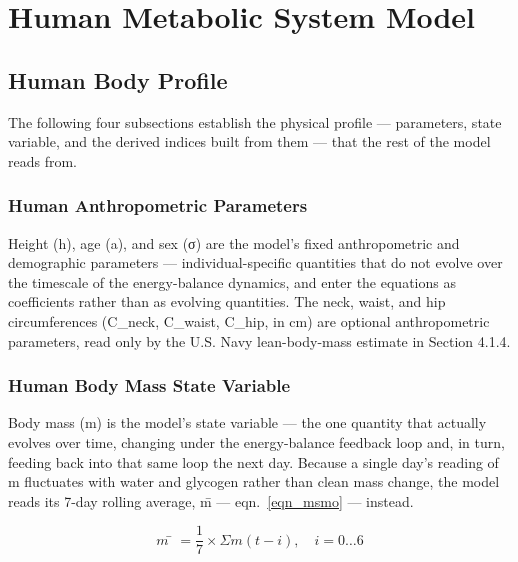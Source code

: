 
\section{Human Metabolic System Model}

\subsection{Human Body Profile}

The following four subsections establish the physical profile — parameters, state variable, and the derived indices built from them — that the rest of the model reads from.

\subsubsection{Human Anthropometric Parameters}

Height (h), age (a), and sex (σ) are the model's fixed anthropometric and demographic parameters — individual-specific quantities that do not evolve over the timescale of the energy-balance dynamics, and enter the equations as coefficients rather than as evolving quantities. The neck, waist, and hip circumferences (C\_neck, C\_waist, C\_hip, in cm) are optional anthropometric parameters, read only by the U.S. Navy lean-body-mass estimate in Section 4.1.4.

\subsubsection{Human Body Mass State Variable}

Body mass (m) is the model's state variable — the one quantity that actually evolves over time, changing under the energy-balance feedback loop and, in turn, feeding back into that same loop the next day. Because a single day's reading of m fluctuates with water and glycogen rather than clean mass change, the model reads its 7-day rolling average, m̄ — eqn.~\eqref{eqn_msmo} — instead.

\begin{equation}
\label{eqn_msmo}
m̄ = \frac{1}{7} × Σ m(t−i), \quad i = 0…6
\end{equation}

